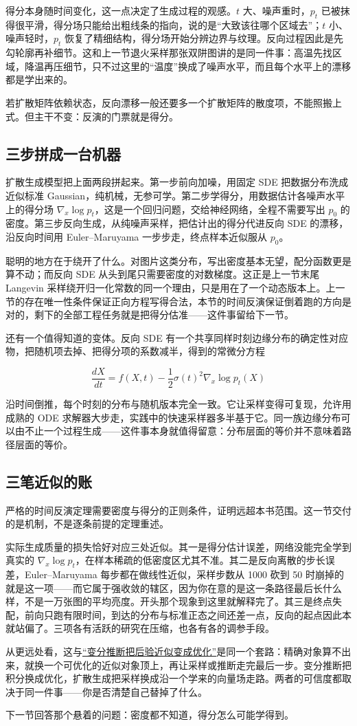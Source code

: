 得分本身随时间变化，这一点决定了生成过程的观感。\(t\) 大、噪声重时，\(p_t\) 已被抹得很平滑，得分场只能给出粗线条的指向，说的是``大致该往哪个区域去''；\(t\) 小、噪声轻时，\(p_t\) 恢复了精细结构，得分场开始分辨边界与纹理。反向过程因此是先勾轮廓再补细节。这和上一节退火采样那张双阱图讲的是同一件事：高温先找区域，降温再压细节，只不过这里的``温度''换成了噪声水平，而且每个水平上的漂移都是学出来的。

若扩散矩阵依赖状态，反向漂移一般还要多一个扩散矩阵的散度项，不能照搬上式。但主干不变：反演的门票就是得分。

\subsection{三步拼成一台机器}

扩散生成模型把上面两段拼起来。第一步前向加噪，用固定 SDE 把数据分布洗成近似标准 Gaussian，纯机械，无参可学。第二步学得分，用数据估计各噪声水平上的得分场 \(\nabla_x\log p_t\)，这是一个回归问题，交给神经网络，全程不需要写出 \(p_0\) 的密度。第三步反向生成，从纯噪声采样，把估计出的得分代进反向 SDE 的漂移，沿反向时间用 Euler--Maruyama 一步步走，终点样本近似服从 \(p_0\)。

聪明的地方在于绕开了什么。对图片这类分布，写出密度基本无望，配分函数更是算不动；而反向 SDE 从头到尾只需要密度的对数梯度。这正是上一节末尾 Langevin 采样绕开归一化常数的同一个理由，只是用在了一个动态版本上。上一节的存在唯一性条件保证正向方程写得合法，本节的时间反演保证倒着跑的方向是对的，剩下的全部工程任务就是把得分估准——这件事留给下一节。

还有一个值得知道的变体。反向 SDE 有一个共享同样时刻边缘分布的确定性对应物，把随机项去掉、把得分项的系数减半，得到的常微分方程

\[
\frac{dX}{dt}=f(X,t)-\frac12\sigma(t)^2\nabla_x\log p_t(X)
\]

沿时间倒推，每个时刻的分布与随机版本完全一致。它让采样变得可复现，允许用成熟的 ODE 求解器大步走，实践中的快速采样器多半基于它。同一族边缘分布可以由不止一个过程生成——这件事本身就值得留意：分布层面的等价并不意味着路径层面的等价。

\subsection{三笔近似的账}

严格的时间反演定理需要密度与得分的正则条件，证明远超本书范围。这一节交付的是机制，不是逐条前提的定理重述。

实际生成质量的损失恰好对应三处近似。其一是得分估计误差，网络没能完全学到真实的 \(\nabla_x\log p_t\)，在样本稀疏的低密度区尤其不准。其二是反向离散的步长误差，Euler--Maruyama 每步都在做线性近似，采样步数从 1000 砍到 50 时崩掉的就是这一项——而它属于强收敛的辖区，因为你在意的是这一条路径最后长什么样，不是一万张图的平均亮度。开头那个现象到这里就解释完了。其三是终点失配，前向只跑有限时间，到达的分布与标准正态之间还差一点，反向的起点因此本就站偏了。三项各有活跃的研究在压缩，也各有各的调参手段。

从更远处看，这与\hyperref[sec:13-Machine-Learning/08-Sampling-and-Inference/03]{``变分推断把后验近似变成优化''}是同一个套路：精确对象算不出来，就换一个可优化的近似对象顶上，再让采样或推断走完最后一步。变分推断把积分换成优化，扩散生成把采样换成沿一个学来的向量场走路。两者的可信度都取决于同一件事——你是否清楚自己替掉了什么。

下一节回答那个悬着的问题：密度都不知道，得分怎么可能学得到。
